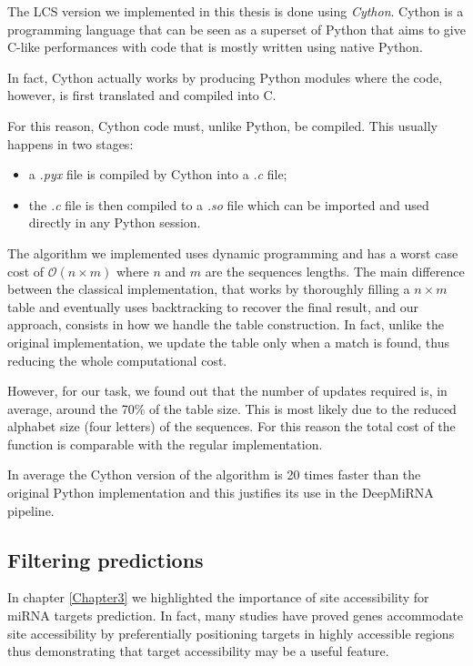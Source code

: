 The LCS version we implemented in this thesis is done using \emph{Cython}\cite{cython}. Cython is a programming language that can be seen as a superset of Python that aims to give C-like performances with code that is mostly written using native Python. 

In fact, Cython actually works by producing Python modules where the code, however, is first translated and compiled into C.

For this reason, Cython code must, unlike Python, be compiled. This usually happens in two stages: 

\begin{itemize}
	\item a \emph{.pyx} file is compiled by Cython into a \emph{.c} file;
	\item the \emph{.c} file is then compiled to a \emph{.so} file which can be imported and used directly in any Python session. 
\end{itemize}   

The algorithm we implemented uses dynamic programming and has a worst case cost of $\mathcal{O}(n \times m)$ where $n$ and $m$ are the sequences lengths. The main difference between the classical implementation, that works by thoroughly filling a $n \times m$ table and eventually uses  backtracking to recover the final result, and our approach, consists in how we handle the table construction. In fact, unlike the original implementation, we update the table only when a match is found, thus reducing the whole computational cost. 

However, for our task, we found out that the number of updates required is, in average, around the 70\% of the table size. This is most likely due to the reduced alphabet size (four letters) of the sequences. For this reason the total cost of the function is comparable with the regular implementation.

In average the Cython version of the algorithm is 20 times faster than the original Python implementation and this justifies its use in the DeepMiRNA pipeline.

      

\subsection{Filtering predictions} \label{sub:filtering_step}
In chapter \ref{Chapter3} we highlighted the importance of site accessibility for miRNA targets prediction. In fact, many studies \cite{helwak} \cite{common_features} have proved genes accommodate site accessibility by preferentially positioning targets in highly accessible regions \cite{accessibility_nrg_role} thus demonstrating that target accessibility may be a useful feature.


